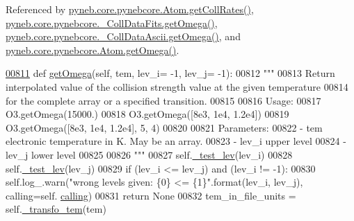 Referenced by \hyperlink{pynebcore_8py_source_l01329}{pyneb.\+core.\+pynebcore.\+Atom.\+get\+Coll\+Rates()}, \hyperlink{pynebcore_8py_source_l00811}{pyneb.\+core.\+pynebcore.\+\_\+\+Coll\+Data\+Fits.\+get\+Omega()}, \hyperlink{pynebcore_8py_source_l01063}{pyneb.\+core.\+pynebcore.\+\_\+\+Coll\+Data\+Ascii.\+get\+Omega()}, and \hyperlink{pynebcore_8py_source_l01262}{pyneb.\+core.\+pynebcore.\+Atom.\+get\+Omega()}.


\begin{DoxyCode}
\hypertarget{classpyneb_1_1core_1_1pynebcore_1_1___coll_data_fits_l00811}{}\hyperlink{classpyneb_1_1core_1_1pynebcore_1_1___coll_data_fits_a07beca7cf9ee37f231754f0458fb8c2f}{00811}     \textcolor{keyword}{def }\hyperlink{classpyneb_1_1core_1_1pynebcore_1_1___coll_data_fits_a07beca7cf9ee37f231754f0458fb8c2f}{getOmega}(self, tem, lev\_i= -1, lev\_j= -1):
00812         \textcolor{stringliteral}{"""}
00813 \textcolor{stringliteral}{        Return interpolated value of the collision strength value at the given temperature }
00814 \textcolor{stringliteral}{            for the complete array or a specified transition.}
00815 \textcolor{stringliteral}{}
00816 \textcolor{stringliteral}{        Usage:}
00817 \textcolor{stringliteral}{            O3.getOmega(15000.)}
00818 \textcolor{stringliteral}{            O3.getOmega([8e3, 1e4, 1.2e4])}
00819 \textcolor{stringliteral}{            O3.getOmega([8e3, 1e4, 1.2e4], 5, 4)}
00820 \textcolor{stringliteral}{        }
00821 \textcolor{stringliteral}{        Parameters:}
00822 \textcolor{stringliteral}{            - tem    electronic temperature in K. May be an array.}
00823 \textcolor{stringliteral}{            - lev\_i  upper level}
00824 \textcolor{stringliteral}{            - lev\_j  lower level}
00825 \textcolor{stringliteral}{}
00826 \textcolor{stringliteral}{        """}
00827         self.\hyperlink{classpyneb_1_1core_1_1pynebcore_1_1___coll_data_fits_a7bc932cc0743068d924a2ac51af0b4d4}{\_test\_lev}(lev\_i)
00828         self.\hyperlink{classpyneb_1_1core_1_1pynebcore_1_1___coll_data_fits_a7bc932cc0743068d924a2ac51af0b4d4}{\_test\_lev}(lev\_j)
00829         \textcolor{keywordflow}{if} (lev\_i <= lev\_j) \textcolor{keywordflow}{and} (lev\_i != -1):
00830             self.log\_.warn(\textcolor{stringliteral}{"wrong levels given: \{0\} <= \{1\}"}.format(lev\_i, lev\_j), calling=self.
      \hyperlink{classpyneb_1_1core_1_1pynebcore_1_1___coll_data_fits_a43c9d096f9508cb475cb4fc3552e1979}{calling})
00831             \textcolor{keywordflow}{return} \textcolor{keywordtype}{None}            
00832         tem\_in\_file\_units = self.\hyperlink{classpyneb_1_1core_1_1pynebcore_1_1___coll_data_fits_afa9318fd2557709e968682f47cefa379}{\_transfo\_tem}(tem)

\end{DoxyCode}

